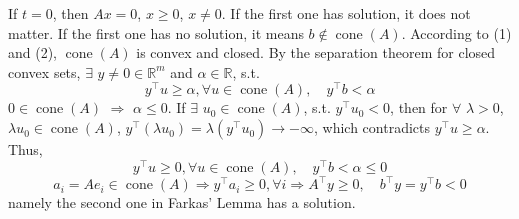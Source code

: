 \documentclass[11pt,letter,notitlepage]{article}
\theoremstyle{definition}
\begin{document}
\begin{solution}
\begin{enumerate}[label=(\arabic*)]
            If $t = 0$, then $A x = 0$, $x \geq 0$, $x \neq 0$. If the first one has solution, it does not matter. If the first one has no solution, it means $b \notin \operatorname{cone}(A)$. According to (1) and (2), $\operatorname{cone}(A)$ is convex and closed. By the separation theorem for closed convex sets, $\exists$ $y \neq 0 \in \mathbb{R}^m$ and $\alpha \in \mathbb{R}$, s.t.
            \[
            y^{\top} u \geq \alpha, \forall u \in \operatorname{cone}(A)
            ,\quad
            y^{\top} b < \alpha
            \]
            $0 \in \operatorname{cone}(A)$ $\Longrightarrow$ $\alpha \leq 0$. If $\exists$ $u_0\in \operatorname{cone}(A)$, s.t. $y^{\top} u_0 < 0$, then for $\forall$ $\lambda > 0$, $\lambda u_0 \in \operatorname{cone}(A)$, $y^{\top} (\lambda u_0) = \lambda (y^{\top} u_0) \to -\infty$, which contradicts $y^{\top} u \geq \alpha$. Thus, 
            \[
            y^{\top} u \geq 0, \forall u \in \operatorname{cone}(A)
            ,\quad
            y^{\top} b < \alpha \leq 0
            \]
            \[
            a_i = A e_i \in \operatorname{cone}(A)
            \Longrightarrow
            y^{\top} a_i \geq 0, \forall i
            \Longrightarrow
            A^{\top} y \geq 0
            ,\quad
            b^{\top} y = y^{\top} b < 0
            \]
            namely the second one in Farkas' Lemma has a solution.
        \end{enumerate}
    \end{solution}

    \newpage
    
    
	
\end{document}
